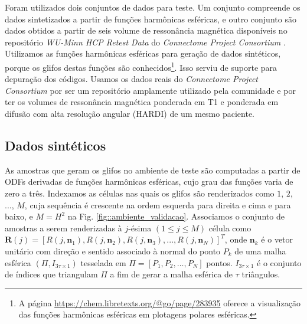 

Foram utilizados dois conjuntos de dados para teste. Um conjunto compreende os dados sintetizados a partir de funções harmônicas esféricas, e outro conjunto são dados obtidos a partir de seis volume de ressonância magnética disponíveis no repositório \textit{WU-Minn HCP Retest Data} do \textit{Connectome Project Consortium} \cite{essen2012}. Utilizamos as funções harmônicas esféricas para geração de dados sintéticos, porque os glifos destas funções são conhecidos\footnote{A página \url{https://chem.libretexts.org/@go/page/283935} oferece a visualização das funções harmônicas esféricas em plotagens polares esféricas.}. Isso serviu de suporte para depuração dos códigos. Usamos os dados reais do \textit{Connectome Project Consortium} por ser um repositório amplamente utilizado pela comunidade e por ter os volumes de ressonância magnética ponderada em T1 e ponderada em difusão com alta resolução angular (HARDI) de um mesmo paciente.


\subsection{Dados sintéticos}
\label{sssec::dados_sinteticos}

 As amostras que geram os glifos no ambiente de teste são computadas a partir de ODFs derivadas de funções harmônicas esféricas, cujo grau das funções varia de zero a três. 
Indexamos as células nas quais os glifos são renderizados como $1$, $2$, ..., $M$, cuja sequência é crescente na ordem esquerda para direita e cima e para baixo, e $M = H^2$ na Fig. \ref{fig::ambiente_validacao}. Associamos o conjunto de amostras a serem renderizadas à $j$-ésima $(1 \leq j \leq M)$ célula como $\boldsymbol{R}(j) = [
R(j, \mathbf{n}_1), 
R(j, \mathbf{n}_2), 
R(j, \mathbf{n}_3), ..., 
R(j, \mathbf{n}_N)
]^T$, onde $\mathbf{n}_k$ é o vetor unitário com direção e sentido associado à normal do ponto $P_k$ de uma malha esférica $(\Pi, I_{3\tau \times 1})$ tesselada em $\Pi = [P_1, P_2, \dots, P_N]$ pontos. $I_{3\tau \times 1}$ é o conjunto de índices que triangulam $\Pi$ a fim de gerar a malha esférica de $\tau$ triângulos.%

